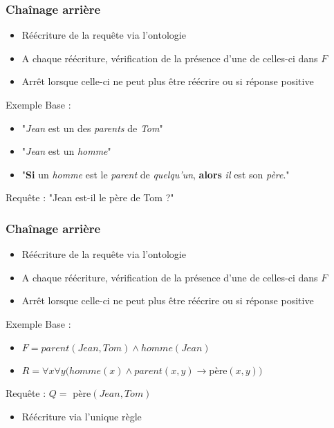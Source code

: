\begin{frame}
	\frametitle{Chaînage arrière}
	\begin{itemize}
		\item Réécriture de la requête via l'ontologie
		\item A chaque réécriture, vérification de la présence d'une de celles-ci dans
		$F$
		\item Arrêt lorsque celle-ci ne peut plus être réécrire ou si réponse positive
	\end{itemize}
	\begin{exampleblock}{Exemple}
	Base :
	\begin{itemize}
		\item "{\em Jean} est un des {\em parents} de {\em Tom}"
		\item "{\em Jean} est un {\em homme}"
		\item "{\bf Si} un {\em homme} est le {\em parent} de {\em quelqu'un}, {\bf
		alors} {\em il} est son {\em père}."\\
	\end{itemize}
	Requête : "Jean est-il le père de Tom ?"\\
	\end{exampleblock}
\end{frame}

\begin{frame}
	\frametitle{Chaînage arrière}
	\begin{itemize}
		\item Réécriture de la requête via l'ontologie
		\item A chaque réécriture, vérification de la présence d'une de celles-ci dans
		$F$
		\item Arrêt lorsque celle-ci ne peut plus être réécrire ou si réponse positive
	\end{itemize}
	\begin{exampleblock}{Exemple}
	Base :
	\begin{itemize}
		\item $F = parent(Jean,Tom) \wedge homme(Jean)$
		\item $R = \forall x \forall y (homme(x) \wedge parent(x,y) \rightarrow
		$père$(x,y))$
	\end{itemize}
	Requête : $Q = $ père$(Jean,Tom)$\\
	\begin{itemize}
		\item Réécriture via l'unique règle
	\end{itemize}
	\end{exampleblock}
\end{frame}



